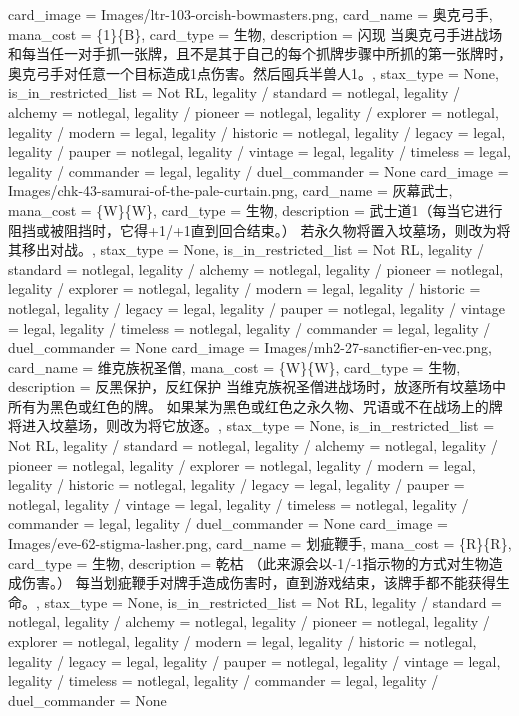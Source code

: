 \documentclass[lang = cn, color = black, 10pt]{AllThatStax}
\begin{document}
\card
{
	card_image = Images/ltr-103-orcish-bowmasters.png,
	card_name = 奥克弓手,
	mana_cost = \{1\}\{B\},
	card_type = 生物,
	description = 闪现
	当奥克弓手进战场和每当任一对手抓一张牌，且不是其于自己的每个抓牌步骤中所抓的第一张牌时，奥克弓手对任意一个目标造成1点伤害。然后囤兵半兽人1。,
	stax_type = None,
	is_in_restricted_list = Not RL,
	legality / standard = notlegal,
	legality / alchemy = notlegal,
	legality / pioneer = notlegal,
	legality / explorer = notlegal,
	legality / modern = legal,
	legality / historic = notlegal,
	legality / legacy = legal,
	legality / pauper = notlegal,
	legality / vintage = legal,
	legality / timeless = legal,
	legality / commander = legal,
	legality / duel_commander = None
}
\card
{
	card_image = Images/chk-43-samurai-of-the-pale-curtain.png,
	card_name = 灰幕武士,
	mana_cost = \{W\}\{W\},
	card_type = 生物,
	description = 武士道1（每当它进行阻挡或被阻挡时，它得+1/+1直到回合结束。）
	若永久物将置入坟墓场，则改为将其移出对战。,
	stax_type = None,
	is_in_restricted_list = Not RL,
	legality / standard = notlegal,
	legality / alchemy = notlegal,
	legality / pioneer = notlegal,
	legality / explorer = notlegal,
	legality / modern = legal,
	legality / historic = notlegal,
	legality / legacy = legal,
	legality / pauper = notlegal,
	legality / vintage = legal,
	legality / timeless = notlegal,
	legality / commander = legal,
	legality / duel_commander = None
}
\card
{
	card_image = Images/mh2-27-sanctifier-en-vec.png,
	card_name = 维克族祝圣僧,
	mana_cost = \{W\}\{W\},
	card_type = 生物,
	description = 反黑保护，反红保护
	当维克族祝圣僧进战场时，放逐所有坟墓场中所有为黑色或红色的牌。
	如果某为黑色或红色之永久物、咒语或不在战场上的牌将进入坟墓场，则改为将它放逐。,
	stax_type = None,
	is_in_restricted_list = Not RL,
	legality / standard = notlegal,
	legality / alchemy = notlegal,
	legality / pioneer = notlegal,
	legality / explorer = notlegal,
	legality / modern = legal,
	legality / historic = notlegal,
	legality / legacy = legal,
	legality / pauper = notlegal,
	legality / vintage = legal,
	legality / timeless = notlegal,
	legality / commander = legal,
	legality / duel_commander = None
}
\card
{
	card_image = Images/eve-62-stigma-lasher.png,
	card_name = 划疵鞭手,
	mana_cost = \{R\}\{R\},
	card_type = 生物,
	description = 乾枯 （此来源会以-1/-1指示物的方式对生物造成伤害。）
	每当划疵鞭手对牌手造成伤害时，直到游戏结束，该牌手都不能获得生命。,
	stax_type = None,
	is_in_restricted_list = Not RL,
	legality / standard = notlegal,
	legality / alchemy = notlegal,
	legality / pioneer = notlegal,
	legality / explorer = notlegal,
	legality / modern = legal,
	legality / historic = notlegal,
	legality / legacy = legal,
	legality / pauper = notlegal,
	legality / vintage = legal,
	legality / timeless = notlegal,
	legality / commander = legal,
	legality / duel_commander = None
}
\end{document}
